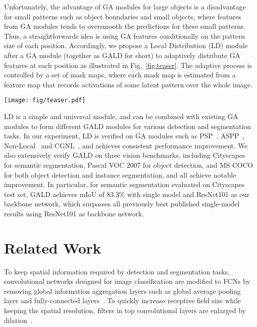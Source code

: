 \documentclass{bmvc2k}
\begin{document}
Unfortunately, the advantage of GA modules for large objects is a disadvantage for small patterns such as object boundaries and small objects, where features from GA modules tends to oversmooth the predictions for these small patterns. Thus, a straightforwards idea is using GA features conditionally on the pattern size of each position. Accordingly, we propose a Local Distribution (LD) module after a GA module (together as GALD for short) to adaptively distribute GA features at each position as illustrated in Fig.~\ref{fig:teaser}. The adaptive process is controlled by a set of mask maps, where each mask map is estimated from a feature map that records activations of some latent pattern over the whole image. 

\begin{figure*}
\centering
\texttt{[image: fig/teaser.pdf]}
\caption{Our proposed GALD framework for semantic segmentation task. The imbalanced spread of information from small and large patterns in GA module is appropriately handled through LD module.
}
\label{fig:teaser}
\end{figure*}

LD is a simple and universal module, and can be combined with existing GA modules to form different GALD modules for various detection and segmentation tasks. In our experiment, LD is verified on GA modules such as PSP~\cite{pspnet}, ASPP~\cite{deeplabv2}, Non-Local~\cite{Nonlocal} and CGNL~\cite{cgnl}, and achieves consistent performance improvement. We also extensively verify GALD on three vision benchmarks, including Cityscapes for semantic segmentation, Pascal VOC 2007 for object detection, and MS COCO for both object detection and instance segmentation, and all achieve notable improvement. In particular, for semantic segmentation evaluated on Cityscapes test set, GALD achieves mIoU of $83.3\%$ with single model and ResNet101 as our backbone network, which surpasses all previously best published single-model results using ResNet101 as backbone network.


 \section{Related Work}
\label{sec:related}
To keep spatial information required by detection and segmentation tasks, convolutional networks designed for image classification are modified to FCNs by removing global information aggregation layers such as global average pooling layer and fully-connected layers~\cite{fcn}. To quickly increase receptive field size while keeping the spatial resolution, filters in top convolutional layers are enlarged by dilation~\cite{deeplabv1, deeplabv2}. 
\end{document}
